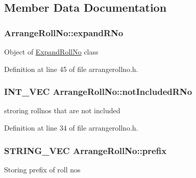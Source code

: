 \subsection{\-Member \-Data \-Documentation}
\hypertarget{classArrangeRollNo_a7ddd59b57f85cf6fea265d38c284df92}{
\subsubsection[{expand\-R\-No}]{ {\bf \-Arrange\-Roll\-No\-::expand\-R\-No}}}\label{da/de9/classArrangeRollNo_a7ddd59b57f85cf6fea265d38c284df92}
\-Object of \hyperlink{classExpandRollNo}{\-Expand\-Roll\-No} class 

\-Definition at line 45 of file arrangerollno.\-h.

\hypertarget{classArrangeRollNo_a1f6740950e3180731b74c3ecdc19b98c}{
\subsubsection[{not\-Included\-R\-No}]{\setlength{\rightskip}{0pt plus 5cm}\-I\-N\-T\-\_\-\-V\-E\-C {\bf \-Arrange\-Roll\-No\-::not\-Included\-R\-No}}}\label{da/de9/classArrangeRollNo_a1f6740950e3180731b74c3ecdc19b98c}
stroring rollnos that are not included 

\-Definition at line 34 of file arrangerollno.\-h.

\hypertarget{classArrangeRollNo_ac70b1f6e601cc5786ef339a38ae18c6f}{
\subsubsection[{prefix}]{\setlength{\rightskip}{0pt plus 5cm}\-S\-T\-R\-I\-N\-G\-\_\-\-V\-E\-C {\bf \-Arrange\-Roll\-No\-::prefix}}}\label{da/de9/classArrangeRollNo_ac70b1f6e601cc5786ef339a38ae18c6f}
\-Storing prefix of roll nos 

